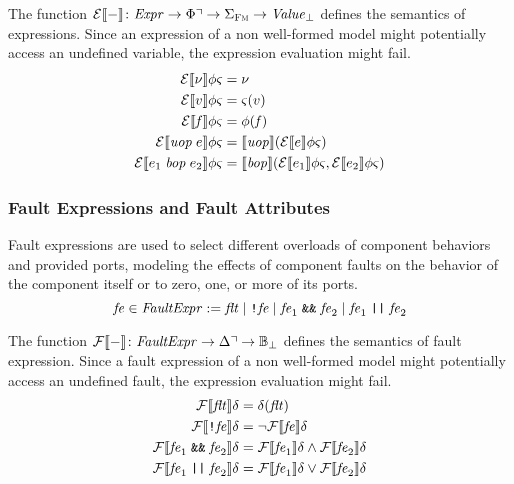 \documentclass[a4paper,10pt,english]{article}
\begin{document}
The function $\mathcal{E} \llbracket - \rrbracket \colon \mathit{Expr} \rightarrow \Phi\urcorner \rightarrow \Sigma_\textsc{Fm} \rightarrow \mathit{Value}_\bot$ defines the
semantics of expressions. Since an expression of a non well-formed model might potentially access an undefined variable, the expression
evaluation might fail. 
\begin{align*}
	\mathcal{E} \llbracket \nu \rrbracket \phi \varsigma &= \nu \\
	\mathcal{E} \llbracket v \rrbracket \phi \varsigma &= \varsigma(v) \\
	\mathcal{E} \llbracket \mathit{f} \rrbracket \phi \varsigma &= \phi(\mathit{f}) \\
	\mathcal{E} \llbracket \mathit{uop}\; e \rrbracket \phi \varsigma &= \llbracket \mathit{uop} \rrbracket (\mathcal{E} \llbracket e \rrbracket \phi
	\varsigma) \\
	\mathcal{E} \llbracket e_1 \;\mathit{bop}\; e_2 \rrbracket \phi \varsigma &= \llbracket \mathit{bop} \rrbracket
	(\mathcal{E} \llbracket e_1 \rrbracket \phi \varsigma, \mathcal{E} \llbracket e_2 \rrbracket \phi \varsigma)
\end{align*}

\subsubsection{Fault Expressions and Fault Attributes}
Fault expressions are used to select different overloads of component behaviors and provided ports, modeling the effects of
component faults on the behavior of the component itself or to zero, one, or more of its ports.
\begin{equation*}
	\mathit{fe} \in \mathit{FaultExpr} := \mathit{flt} \mid \texttt{!} \mathit{fe} \mid
	\mathit{fe}_1 \; \texttt{\&\&} \; \mathit{fe}_2
	\mid \mathit{fe}_1 \; \texttt{||} \; \mathit{fe}_2
\end{equation*}

The function $\mathcal{F} \llbracket - \rrbracket \colon \mathit{FaultExpr} \rightarrow \Delta\urcorner \rightarrow \mathbb{B}_\bot$ defines the
semantics of fault expression. Since a fault expression of a non well-formed model might potentially access an undefined fault,
the expression evaluation might fail.
\begin{align*}
	\mathcal{F} \llbracket \mathit{flt} \rrbracket \delta &= \delta(\mathit{flt}) \\
	\mathcal{F} \llbracket \texttt{!} \mathit{fe} \rrbracket \delta &= \neg \mathcal{F} \llbracket \mathit{fe} \rrbracket \delta \\
	\mathcal{F} \llbracket \mathit{fe}_1 \; \texttt{\&\&} \; \mathit{fe}_2 \rrbracket \delta &= \mathcal{F} \llbracket \mathit{fe}_1 \rrbracket \delta \wedge
	\mathcal{F} \llbracket \mathit{fe}_2 \rrbracket \delta \\
	\mathcal{F} \llbracket \mathit{fe}_1 \; \texttt{||} \; \mathit{fe}_2 \rrbracket \delta &= \mathcal{F} \llbracket \mathit{fe}_1 \rrbracket \delta \vee
	\mathcal{F} \llbracket \mathit{fe}_2 \rrbracket \delta
\end{align*}
\end{document}
